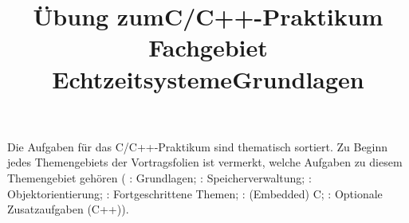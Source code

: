 

\title{Übung zum\linebreak[1]C/C++-Praktikum \linebreak[1] Fachgebiet Echtzeitsysteme\linebreak[1]\linebreak[1] Grundlagen}

\setcounter{section}{0}



\maketitle

\noindent Die Aufgaben für das C/C++-Praktikum sind thematisch sortiert.
Zu Beginn jedes Themengebiets der Vortragsfolien ist vermerkt, welche Aufgaben zu diesem Themengebiet gehören (%
\ExercisePrefixBasics: Grundlagen; 
\ExercisePrefixMemory: Speicherverwaltung;
\ExercisePrefixObjectOrientation: Objektorientierung;
\ExercisePrefixAdvanced: Fortgeschrittene Themen;
\ExercisePrefixEmbeddedC: (Embedded) C;
\ExercisePrefixElevator: Optionale Zusatzaufgaben (C++)).
%
\setcounter{tocdepth}{1}
\setlength\cftsecnumwidth{10em}
\setlength\cftbeforesecskip{.1em} %





\newpage

\newpage

\newpage

\newpage


\cclicense


